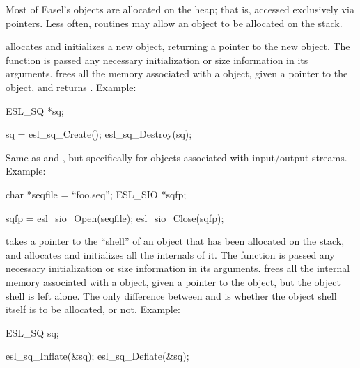 Most of Easel's objects are allocated on the heap; that is, accessed
exclusively via pointers. Less often, routines may allow an object to
be allocated on the stack.

\begin{sreitems}{}
\item [\ccode{Create,Destroy}] 
   allocates and initializes a new 
  object, returning a pointer to the new
  object. The  function is passed any necessary
  initialization or size information in its arguments.
   frees all the memory associated
  with a  object,  given a pointer to the object,
  and returns . Example:

\begin{cchunk}
ESL_SQ *sq;

sq = esl_sq_Create();
esl_sq_Destroy(sq);
\end{cchunk}
  
\item [\ccode{Open,Close}] 
  Same as  and , but specifically for
  objects associated with input/output streams. Example:

\begin{cchunk}
char        *seqfile = ``foo.seq'';
ESL_SIO     *sqfp;

sqfp = esl_sio_Open(seqfile);
esl_sio_Close(sqfp);
\end{cchunk}


\item [\ccode{Inflate,Deflate}]
   takes a pointer to the ``shell'' of an
   object that has been allocated on the stack, and
  allocates and initializes all the internals of it. The
   function is passed any necessary initialization or
  size information in its arguments.  
  frees all the internal memory associated with a  object,
  given a pointer to the object, but the object shell is left alone.
  The only difference between  and
   is whether the object shell itself is to be
  allocated, or not. Example:

\begin{cchunk}
ESL_SQ  sq;

esl_sq_Inflate(&sq);
esl_sq_Deflate(&sq);
\end{cchunk}




\end{sreitems}
